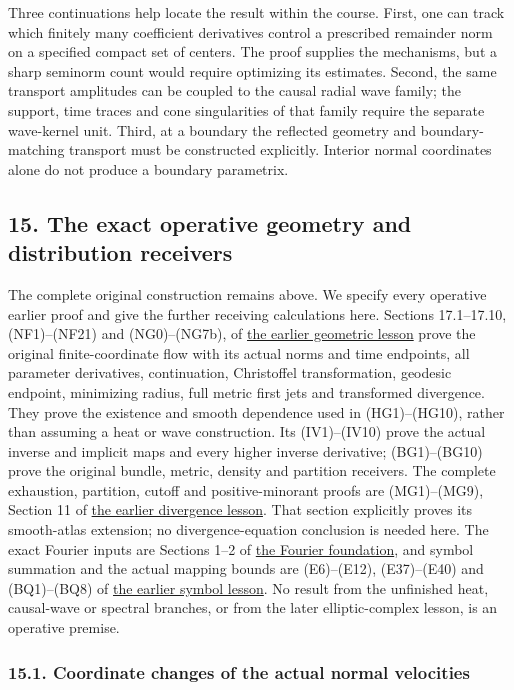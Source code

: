\documentclass[
  11pt,
]{article}
\begin{document}
Three continuations help locate the result within the course. First, one
can track which finitely many coefficient derivatives control a
prescribed remainder norm on a specified compact set of centers. The
proof supplies the mechanisms, but a sharp seminorm count would require
optimizing its estimates. Second, the same transport amplitudes can be
coupled to the causal radial wave family; the support, time traces and
cone singularities of that family require the separate wave-kernel unit.
Third, at a boundary the reflected geometry and boundary-matching
transport must be constructed explicitly. Interior normal coordinates
alone do not produce a boundary parametrix.

\subsection{15. The exact operative geometry and distribution
receivers}\label{the-exact-operative-geometry-and-distribution-receivers}

The complete original construction remains above. We specify every
operative earlier proof and give the further receiving calculations
here. Sections 17.1--17.10, (NF1)--(NF21) and (NG0)--(NG7b), of
\href{geometric-microlocal-calculus.pdf}{the earlier geometric lesson}
prove the original finite-coordinate flow with its actual norms and time
endpoints, all parameter derivatives, continuation, Christoffel
transformation, geodesic endpoint, minimizing radius, full metric first
jets and transformed divergence. They prove the existence and smooth
dependence used in (HG1)--(HG10), rather than assuming a heat or wave
construction. Its (IV1)--(IV10) prove the actual inverse and implicit
maps and every higher inverse derivative; (BG1)--(BG10) prove the
original bundle, metric, density and partition receivers. The complete
exhaustion, partition, cutoff and positive-minorant proofs are
(MG1)--(MG9), Section 11 of \href{divergence-solvability.pdf}{the earlier
divergence lesson}. That section explicitly proves its smooth-atlas
extension; no divergence-equation conclusion is needed here. The exact
Fourier inputs are Sections 1--2 of \href{prerequisite-bridges.pdf}{the
Fourier foundation}, and symbol summation and the actual mapping bounds
are (E6)--(E12), (E37)--(E40) and (BQ1)--(BQ8) of
\href{euclidean-symbol-calculus.pdf}{the earlier symbol lesson}. No
result from the unfinished heat, causal-wave or spectral branches, or
from the later elliptic-complex lesson, is an operative premise.

\subsubsection{15.1. Coordinate changes of the actual normal
velocities}\label{coordinate-changes-of-the-actual-normal-velocities}
\end{document}
